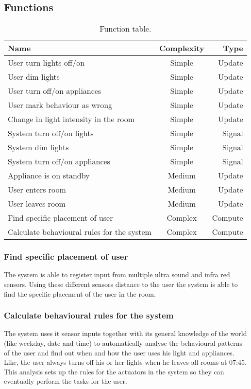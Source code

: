 \subsection{Functions}
\begin{table}[hbtp]
\centering
\begin{tabular}{lcr}
\toprule
\textbf{Name}																& \textbf{Complexity}	& \textbf{Type} \\
\midrule
User turn lights off/on				& Simple	& Update  \\
User dim lights					& Simple	& Update  \\
User turn off/on appliances			& Simple	& Update  \\
User mark behaviour as wrong			& Simple	& Update  \\
Change in light intensity in the room		& Simple	& Update  \\
System turn off/on lights			& Simple	& Signal  \\
System dim lights				& Simple	& Signal  \\
System turn off/on appliances			& Simple	& Signal  \\
Appliance is on standby				& Medium	& Update  \\
User enters room				& Medium	& Update  \\
User leaves room				& Medium	& Update  \\
Find specific placement of user			& Complex	& Compute \\
Calculate behavioural rules for the system	& Complex	& Compute \\
\bottomrule
\end{tabular}
\caption{Function table.}
\label{table:functionlist}
\end{table}

\subsubsection{Find specific placement of user}
The system is able to register input from multiple ultra sound and infra red sensors. Using these different sensors distance to the user the system is able to find the specific placement of the user in the room.

\subsubsection{Calculate behavioural rules for the system}
The system uses it sensor inputs together with its general knowledge of the world (like weekday, date and time) to automatically analyse the behavioural patterns of the user and find out when and how the user uses his light and appliances. Like, the user always turns off his or her lights when he leaves all rooms at 07:45. This analysis sets up the rules for the actuators in the system so they can eventually perform the tasks for the user.
